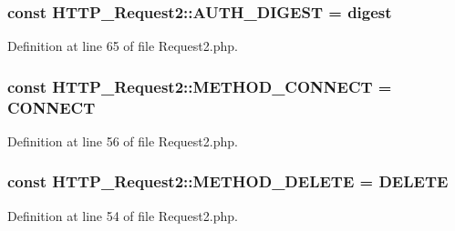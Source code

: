 \subsubsection[{\texorpdfstring{A\+U\+T\+H\+\_\+\+D\+I\+G\+E\+ST}{AUTH_DIGEST}}]{\setlength{\rightskip}{0pt plus 5cm}const H\+T\+T\+P\+\_\+\+Request2\+::\+A\+U\+T\+H\+\_\+\+D\+I\+G\+E\+ST = \textquotesingle{}digest\textquotesingle{}}\hypertarget{classHTTP__Request2_a4b05b6842e05183dc3ac3c7ff613b3c7}{}\label{classHTTP__Request2_a4b05b6842e05183dc3ac3c7ff613b3c7}


Definition at line 65 of file Request2.\+php.

\subsubsection[{\texorpdfstring{M\+E\+T\+H\+O\+D\+\_\+\+C\+O\+N\+N\+E\+CT}{METHOD_CONNECT}}]{\setlength{\rightskip}{0pt plus 5cm}const H\+T\+T\+P\+\_\+\+Request2\+::\+M\+E\+T\+H\+O\+D\+\_\+\+C\+O\+N\+N\+E\+CT = \textquotesingle{}C\+O\+N\+N\+E\+CT\textquotesingle{}}\hypertarget{classHTTP__Request2_af03c573103c3f5bdf3ec9c3e95a08e59}{}\label{classHTTP__Request2_af03c573103c3f5bdf3ec9c3e95a08e59}


Definition at line 56 of file Request2.\+php.

\subsubsection[{\texorpdfstring{M\+E\+T\+H\+O\+D\+\_\+\+D\+E\+L\+E\+TE}{METHOD_DELETE}}]{\setlength{\rightskip}{0pt plus 5cm}const H\+T\+T\+P\+\_\+\+Request2\+::\+M\+E\+T\+H\+O\+D\+\_\+\+D\+E\+L\+E\+TE = \textquotesingle{}D\+E\+L\+E\+TE\textquotesingle{}}\hypertarget{classHTTP__Request2_ab6edf309179aa4535aa6a9b12b260978}{}\label{classHTTP__Request2_ab6edf309179aa4535aa6a9b12b260978}


Definition at line 54 of file Request2.\+php.


